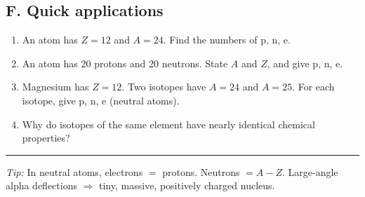 \documentclass[11pt,a4paper]{article}
\begin{document}
\subsection*{F. Quick applications}
\begin{enumerate}[resume]
  \item An atom has $Z=12$ and $A=24$. Find the numbers of p, n, e.
  \item An atom has 20 protons and 20 neutrons. State $A$ and $Z$, and give p, n, e.
  \item Magnesium has $Z=12$. Two isotopes have $A=24$ and $A=25$. For each isotope, give p, n, e (neutral atoms).
  \item Why do isotopes of the same element have nearly identical chemical properties?
\end{enumerate}

\vfill
\hrule
\small \textit{Tip:} In neutral atoms, electrons $=$ protons. Neutrons $=A-Z$. Large-angle alpha deflections $\Rightarrow$ tiny, massive, positively charged nucleus.
\end{document}
